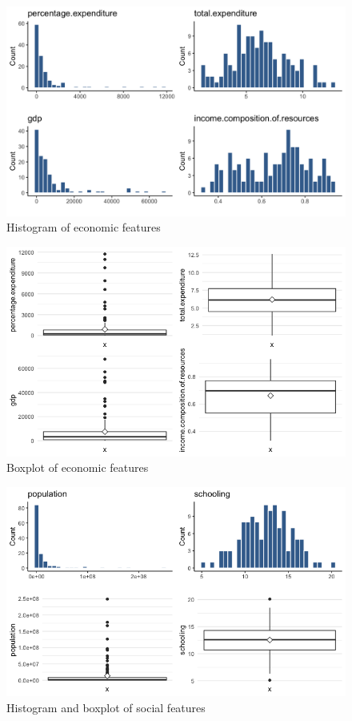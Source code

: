
\begin{figure}[H]
	\centering
	\includegraphics{figures/eda/histogram_economic_features.png}
	\caption{Histogram of economic features}
	\label{fig:histogram_economic_features}
\end{figure}

\begin{figure}[H]
	\centering
	\includegraphics{figures/eda/boxplot_economic_features.png}
	\caption{Boxplot of economic features}
	\label{fig:boxplot_economic_features}
\end{figure}


\begin{figure}[H]
	\centering
	\includegraphics{figures/eda/histogram_boxplot_social_features.png}
	\caption{Histogram and boxplot of social features}
	\label{fig:histogram_boxplot_social_features}
\end{figure}

